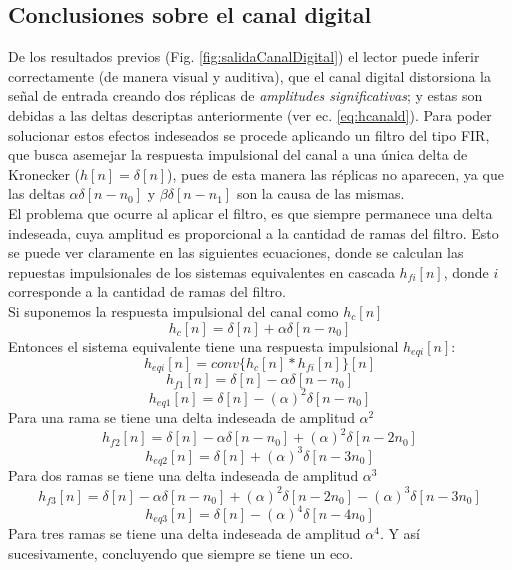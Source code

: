 \documentclass[letterpaper, 10 pt, conference]{ieeeconf}  %
\begin{document}
\subsection{Conclusiones sobre el canal digital}
De los resultados previos (Fig. \ref{fig:salidaCanalDigital}) el lector puede inferir correctamente (de manera visual y auditiva), que el canal digital distorsiona la se\~nal de entrada creando dos r\'eplicas de \textit{amplitudes significativas}; y estas son debidas a las deltas descriptas anteriormente (ver ec. \ref{eq:hcanald}). Para poder solucionar estos efectos indeseados se procede aplicando un filtro del tipo FIR, que busca asemejar la respuesta impulsional del canal a una \'unica delta de Kronecker ($h[n]=\delta[n]$), pues de esta manera las r\'eplicas no aparecen, ya que las deltas $\alpha\delta[n-n_0]$ y $\beta\delta[n-n_1]$ son la causa de las mismas. \\
El problema que ocurre al aplicar el filtro, es que siempre permanece una delta indeseada, cuya amplitud es proporcional a la cantidad de ramas del filtro. Esto se puede ver claramente en las siguientes ecuaciones, donde se calculan las repuestas impulsionales de los sistemas equivalentes en cascada $h_{fi}[n]$, donde $i$ corresponde a la cantidad de ramas del filtro. \\
Si suponemos la respuesta impulsional del canal como $h_c[n]$
\begin{equation*}
  h_c[n] = \delta[n] + \alpha\delta[n-n_0]
\end{equation*}
Entonces el sistema equivalente tiene una respuesta impulsional $h_{eqi}[n]$:
\begin{equation*}
  h_{eqi}[n] = conv\{ h_c[n] * h_{fi}[n] \}[n]
\end{equation*}
\begin{equation*}
  h_{f1}[n] = \delta[n] - \alpha\delta[n-n_0]
\end{equation*}
\begin{equation*}
  h_{eq1}[n] = \delta[n] - (\alpha)^2\delta[n-n_0]
\end{equation*}
Para una rama se tiene una delta indeseada de amplitud $\alpha^2$
\begin{equation*}
  h_{f2}[n] = \delta[n] - \alpha\delta[n-n_0] + (\alpha)^2\delta[n-2n_0]
\end{equation*}
\begin{equation*}
  h_{eq2}[n] = \delta[n] + (\alpha)^3\delta[n-3n_0]
\end{equation*}
Para dos ramas se tiene una delta indeseada de amplitud $\alpha^3$
\begin{equation*}
  h_{f3}[n] = \delta[n] - \alpha\delta[n-n_0] + (\alpha)^2\delta[n-2n_0] - (\alpha)^3\delta[n-3n_0]
\end{equation*}
\begin{equation*}
  h_{eq3}[n] = \delta[n] - (\alpha)^4\delta[n-4n_0]
\end{equation*}
Para tres ramas se tiene una delta indeseada de amplitud $\alpha^4$. Y as\'i sucesivamente, concluyendo que siempre se tiene un eco.
\end{document}
